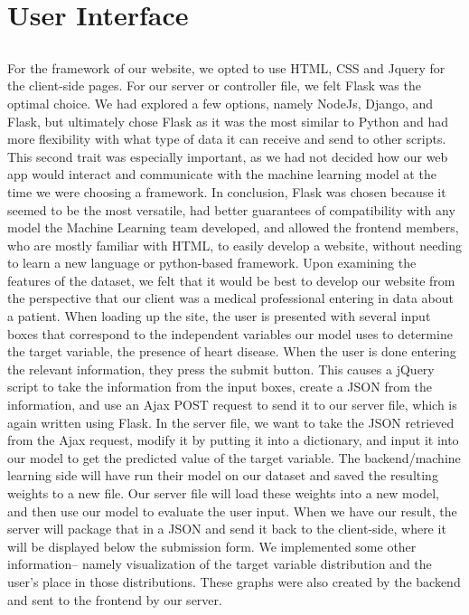 \documentclass[12pt]{article}
\begin{document}
\section*{User Interface}
\subsection*{}
For the framework of our website, we opted to use HTML, CSS and Jquery for the client-side pages. For our server or controller file, we felt Flask was the optimal choice. We had explored a few options, namely NodeJs, Django, and Flask, but ultimately chose Flask as it was the most similar to Python and had more flexibility with what type of data it can receive and send to other scripts. This second trait was especially important, as we had not decided how our web app would interact and communicate with the machine learning model at the time we were choosing a framework. In conclusion, Flask was chosen because it seemed to be the most versatile, had better guarantees of compatibility with any model the Machine Learning team developed, and allowed the frontend members, who are mostly familiar with HTML, to easily develop a website, without needing to learn a new language or python-based framework. 
	Upon examining the features of the dataset, we felt that it would be best to develop our website from the perspective that our client was a medical professional entering in data about a patient. When loading up the site, the user is presented with several input boxes that correspond to the independent variables our model uses to determine the target variable, the presence of heart disease. When the user is done entering the relevant information, they press the submit button. This causes a jQuery script to take the information from the input boxes, create a JSON from the information, and use an Ajax POST request to send it to our server file, which is again written using Flask. In the server file, we want to take the JSON retrieved from the Ajax request, modify it by putting it into a dictionary, and input it into our model to get the predicted value of the target variable. The backend/machine learning side will have run their model on our dataset and saved the resulting weights to a new file. Our server file will load these weights into a new model, and then use our model to evaluate the user input. When we have our result, the server will package that in a JSON and send it back to the client-side, where it will be displayed below the submission form.
	We implemented some other information-- namely visualization of the target variable distribution and the user's place in those distributions. These graphs were also created by the backend and sent to the frontend by our server.
\end{document}
